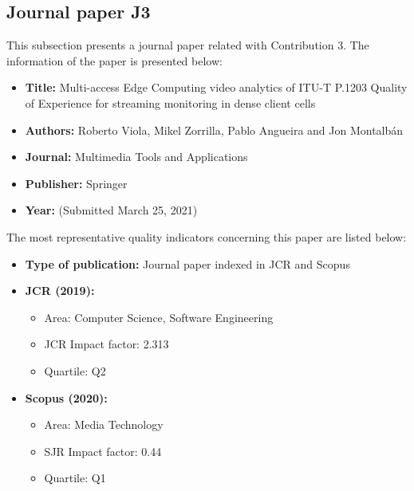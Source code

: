 \subsection{Journal paper J3}
\label{chap:MTAP2020}
This subsection presents a journal paper related with Contribution 3.
The information of the paper is presented below:
\begin{itemize} \itemsep1pt\parskip0pt
	\item \textbf{Title:} Multi-access Edge Computing video analytics of ITU-T P.1203 Quality of Experience for streaming monitoring in dense client cells
	\item \textbf{Authors:} Roberto Viola, Mikel Zorrilla, Pablo Angueira and Jon Montalb\'an
	\item \textbf{Journal:} Multimedia Tools and Applications
	\item \textbf{Publisher:} Springer
	\item \textbf{Year:} (Submitted March 25, 2021)
\end{itemize}
The most representative quality indicators concerning this paper are listed below:
\begin{itemize} \itemsep1pt\parskip0pt
	\item \textbf{Type of publication:} Journal paper indexed in JCR and Scopus
	\item \textbf{JCR (2019):}
	\begin{itemize}
		\item Area: Computer Science, Software Engineering
		\item JCR Impact factor: 2.313
		\item Quartile: Q2
	\end{itemize}
	\item \textbf{Scopus (2020):}
	\begin{itemize}
		\item Area: Media Technology
		\item SJR Impact factor: 0.44
		\item Quartile: Q1
	\end{itemize}
\end{itemize}

